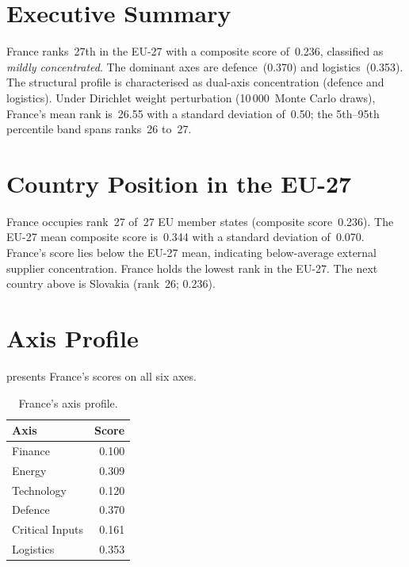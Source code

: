 \documentclass[12pt,a4paper]{article}
\begin{document}
\hypersetup{pageanchor=true}
\pagestyle{fancy}
\renewcommand{\headrulewidth}{0.4pt}


\section{Executive Summary}
\label{sec:summary}

France ranks~27th in the EU-27 with a composite \ISI score of~0.236, classified as \emph{mildly concentrated}.  The dominant axes are defence~(0.370) and logistics~(0.353).  The structural profile is characterised as dual-axis concentration (defence and logistics).  Under Dirichlet weight perturbation (10\,000~Monte Carlo draws), France's mean rank is~26.55 with a standard deviation of~0.50; the 5th--95th percentile band spans ranks~26 to~27.


\section{Country Position in the EU-27}
\label{sec:position}

France occupies rank~27 of~27 EU member states (composite score~0.236).  The EU-27 mean composite score is~0.344 with a standard deviation of~0.070.  France's score lies below the EU-27 mean, indicating below-average external supplier concentration.  France holds the lowest rank in the EU-27.  The next country above is Slovakia (rank~26; 0.236).


\section{Axis Profile}
\label{sec:axis-profile}

 presents France's scores on all six \ISI axes.

\begin{table}[htbp]
\centering\small
\caption{France's \ISI axis profile.}
\label{tab:axis-profile}
\begin{tabular}{@{}lr@{}}
\toprule
\textbf{Axis} & \textbf{Score} \\
\midrule
    Finance           & 0.100 \\
    Energy            & 0.309 \\
    Technology        & 0.120 \\
    Defence           & 0.370 \\
    Critical Inputs   & 0.161 \\
    Logistics         & 0.353 \\
\bottomrule
\end{tabular}
\end{table}
\end{document}
